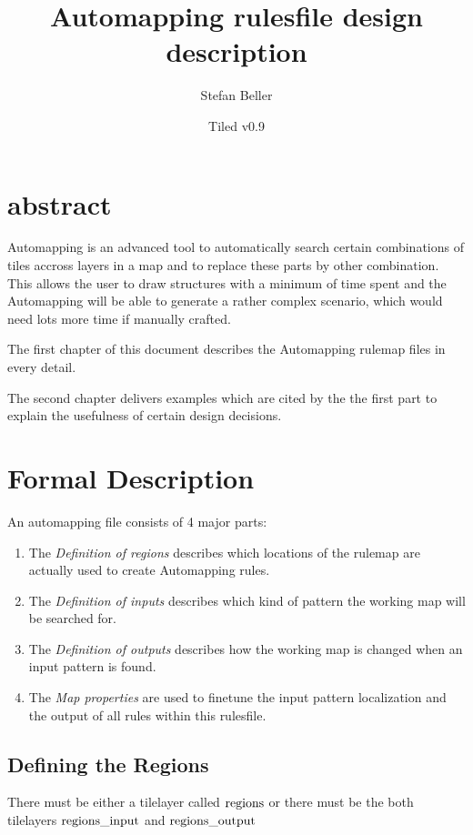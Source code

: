 \documentclass[dvips, a4paper, 12pt,listof=totoc, oneside, parskip]{scrbook}
\title{Automapping rulesfile design description}
\date{Tiled v0.9}
\author{Stefan Beller}
\begin{document}
\maketitle

\chapter*{abstract}
Automapping is an advanced tool to automatically search certain
combinations of tiles accross layers in a map and to replace
these parts by other combination. This allows the user to draw
structures with a minimum of time spent and the Automapping will be able
to generate a rather complex scenario, which would need lots more time if
manually crafted.

The first chapter of this document describes the Automapping rulemap
files in every detail.

The second chapter delivers examples which are cited by the the first part to
explain the usefulness of certain design decisions.


\chapter{Formal Description}
An automapping file consists of 4 major parts:

\begin{enumerate}
  \item The \emph{Definition of regions} describes which locations of the rulemap
  are actually used to create Automapping rules.

  \item The \emph{Definition of inputs} describes which kind of pattern the working map
  will be searched for.

  \item The \emph{Definition of outputs} describes how the working map is changed when
  an input pattern is found.

  \item The \emph{Map properties} are used to finetune the input pattern localization and the output of all rules within this rulesfile.
\end{enumerate}






\section{Defining the Regions}
There must be either a tilelayer called $\textup{regions}$ or there must be
the both tilelayers $\textup{regions}\_\textup{input}$ and
$\textup{regions}\_\textup{output}$
\end{document}
